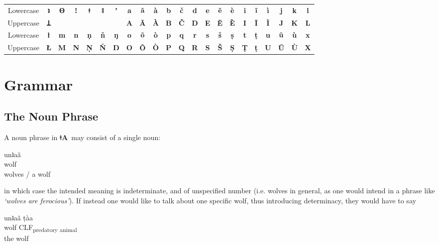 \documentclass[11pt]{book}
\newcommand{\qcn}[1]{\textbf{#1}}
\newcommand{\langname}{\qcn{ǂA}~}
\newcommand{\grammsc}[1]{\textsc{#1}}
\newcommand{\CLF}[1]{\grammsc{CLF}\textsubscript{#1}}
\begin{document}
\begin{center}
\begin{tabular}{*{22}{|c}|}
\hline
Lowercase & \qcn{ʇ}&\multirow{2}{*}{\qcn{ʘ}}&\multirow{2}{*}{\qcn{ǃ}}&\multirow{2}{*}{\qcn{ǂ}}&\multirow{2}{*}{\qcn{ǁ}}&\multirow{2}{*}{\qcn{ʼ}}&\qcn{a}&\qcn{ã}&\qcn{à}&\qcn{b}&
\qcn{č}&\qcn{d}&\qcn{e}&\qcn{ẽ}&\qcn{è}&\qcn{i}&\qcn{ĩ}&\qcn{ì}&\qcn{j}&\qcn{k} &\qcn{l}\\
Uppercase & \qcn{Ʇ}& & &  & & &\qcn{A}&\qcn{Ã}&\qcn{À}&\qcn{B}&
                    \qcn{Č}&\qcn{D}&\qcn{E}&\qcn{Ẽ}&\qcn{È}&\qcn{I}&\qcn{Ĩ}&\qcn{Ì}&\qcn{J}&\qcn{K} &\qcn{L}\\ \hline \hline
Lowercase & \qcn{ł} &\qcn{m}&\qcn{n}&\qcn{ṇ}&\qcn{ň}&\qcn{ŋ}&\qcn{o}&\qcn{õ}&\qcn{ò}&\qcn{p}&\qcn{q}&\qcn{r}&\qcn{s}&
                    \qcn{š}&\qcn{ṣ}&\qcn{t}&\qcn{ṭ}&\qcn{u}&\qcn{ũ}&\qcn{ù}&\qcn{x}\\ 
Uppercase &\qcn{Ł} & \qcn{M}&\qcn{N}&\qcn{Ṇ}&\qcn{Ň}&\qcn{Ŋ}&\qcn{O}&\qcn{Õ}&\qcn{Ò}&\qcn{P}&\qcn{Q}&\qcn{R}&\qcn{S}&
                    \qcn{Š}&\qcn{Ṣ}&\qcn{Ṭ}&\qcn{ṭ}&\qcn{U}&\qcn{Ũ}&\qcn{Ù}&\qcn{X}\\ \hline
\end{tabular}
\end{center}

\chapter{Grammar}

\section{The Noun Phrase}

A noun phrase in \langname may consist of a single noun:

\begin{exe}
\ex
\gll unʇaã\\
wolf\\
\glt wolves / a wolf
\end{exe}

in which case the intended meaning is indeterminate, and of unspecified number (i.e. wolves in general, as one would intend in a phrase like \emph{`wolves are ferocious'}). If instead one would like to talk about one specific wolf, thus introducing determinacy, they would have to say

\begin{exe}
\ex
\gll unʇaã ṭàa\\
wolf \CLF{predatory animal}\\
\glt the wolf
\end{exe}
\end{document}
